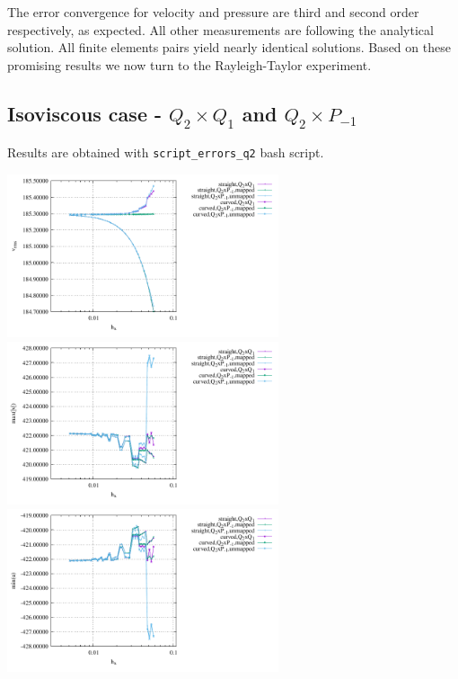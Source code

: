 The error convergence for velocity and pressure are third and second order 
respectively, as expected. All other measurements are following the analytical solution.
All finite elements pairs yield nearly identical solutions.
Based on these promising results we now turn to the Rayleigh-Taylor experiment.

\newpage
\subsection*{Isoviscous case - $Q_2\times Q_1$ and $Q_2\times P_{-1}$}

Results are obtained with {\tt script\_errors\_q2} bash script.

\begin{center}
\includegraphics[width=8cm]{python_codes/fieldstone_25/results/isoviscous/vrms.pdf}
\includegraphics[width=8cm]{python_codes/fieldstone_25/results/isoviscous/max_vel.pdf}\\
\includegraphics[width=8cm]{python_codes/fieldstone_25/results/isoviscous/min_u.pdf}

\end{center}
